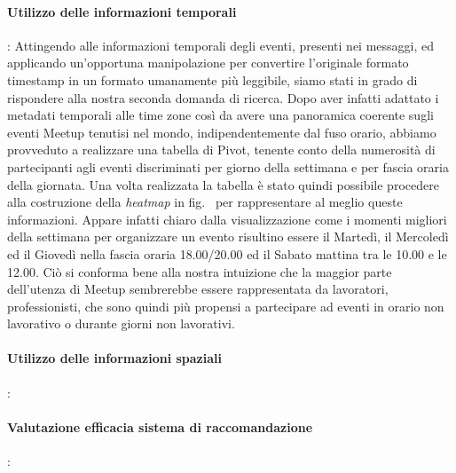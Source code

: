 \documentclass[fleqn,10pt]{SelfArx} %
\begin{document}
\paragraph{Utilizzo delle informazioni temporali}:
Attingendo alle informazioni temporali degli eventi, presenti nei messaggi, ed applicando un'opportuna manipolazione per convertire l'originale formato timestamp in un formato umanamente più leggibile, siamo stati in grado di rispondere alla nostra seconda domanda di ricerca. Dopo aver infatti adattato i metadati temporali alle time zone così da avere una panoramica coerente sugli eventi Meetup tenutisi nel mondo, indipendentemente dal fuso orario, abbiamo provveduto a realizzare una tabella di Pivot, tenente conto della numerosità di partecipanti agli eventi discriminati per giorno della settimana e per fascia oraria della giornata. Una volta realizzata la tabella è stato quindi possibile procedere alla costruzione della \textit{heatmap} in fig.~ %
per rappresentare al meglio queste informazioni. Appare infatti chiaro dalla visualizzazione come i momenti migliori della settimana per organizzare un evento risultino essere il Martedì, il Mercoledì ed il Giovedì nella fascia oraria 18.00/20.00 ed il Sabato mattina tra le 10.00 e le 12.00. Ciò si conforma bene alla nostra intuizione che la maggior parte dell'utenza di Meetup sembrerebbe essere rappresentata da lavoratori, professionisti, che sono quindi più propensi a partecipare ad eventi in orario non lavorativo o durante giorni non lavorativi.
\paragraph{Utilizzo delle informazioni spaziali}:
\paragraph{Valutazione efficacia sistema di raccomandazione}:
\end{document}
